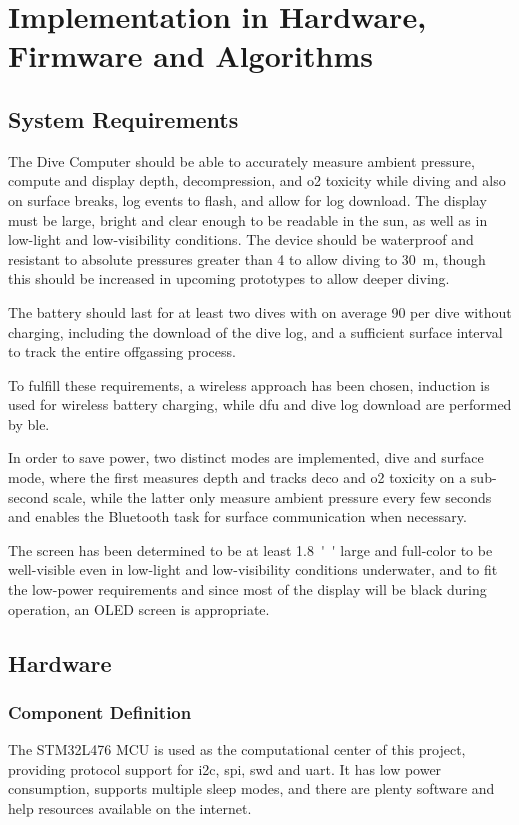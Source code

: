 \chapter{Implementation in Hardware, Firmware and Algorithms}

\section{System Requirements}
The Dive Computer should be able to accurately measure ambient pressure, compute and display depth, decompression, and \gls{o2} toxicity while diving and also on surface breaks, log events to flash, and allow for log download. The display must be large, bright and clear enough to be readable in the sun, as well as in low-light and low-visibility conditions. The device should be waterproof and resistant to absolute pressures greater than \SI{4}{\Bar} to allow diving to \SI{30}{\meter}, though this should be increased in upcoming prototypes to allow deeper diving.

The battery should last for at least two dives with on average \SI{90}{\min} per dive without charging, including the download of the dive log, and a sufficient surface interval to track the entire offgassing process.

To fulfill these requirements, a wireless approach has been chosen, induction is used for wireless battery charging, while \gls{dfu} and dive log download are performed by \gls{ble}.

In order to save power, two distinct modes are implemented, dive and surface mode, where the first measures depth and tracks \gls{deco} and \gls{o2} toxicity on a sub-second scale, while the latter only measure ambient pressure every few seconds and enables the Bluetooth task for surface communication when necessary.

The screen has been determined to be at least \SI{1.8}{''} large and full-color to be well-visible even in low-light and low-visibility conditions underwater, and to fit the low-power requirements and since most of the display will be black during operation, an OLED screen is appropriate.

\section{Hardware}\label{section:hardware}
\subsection{Component Definition}\label{subsection:definition}
The STM32L476 MCU is used as the computational center of this project, providing protocol support for \gls{i2c}, \gls{spi}, \gls{swd} and \gls{uart}. It has low power consumption, supports multiple sleep modes, and there are plenty software and help resources available on the internet.

